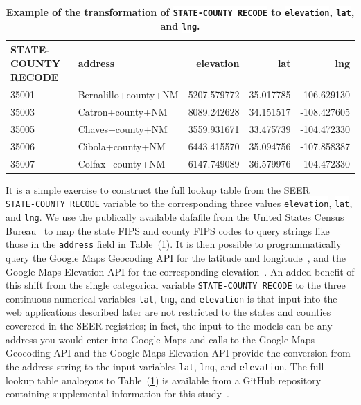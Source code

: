 \documentclass[10pt,letterpaper]{article}
\newcommand{\codewhite}[1]{\colorbox{white}{\texttt{#1}}}
\begin{document}
\begin{table}[!ht]
\begin{adjustwidth}{-2.25in}{0in} %
\caption{\label{tab:nmhead} {\bf Example of the transformation of \codewhite{STATE-COUNTY RECODE} to \codewhite{elevation}, \codewhite{lat}, and \codewhite{lng}.}}
\begin{tabular}{llrrr}
\toprule
 STATE-COUNTY RECODE &               address &    elevation &        lat &         lng \\
\midrule
35001 &  Bernalillo+county+NM &  5207.579772 &  35.017785 & -106.629130 \\
35003 &      Catron+county+NM &  8089.242628 &  34.151517 & -108.427605 \\
35005 &      Chaves+county+NM &  3559.931671 &  33.475739 & -104.472330 \\
35006 &      Cibola+county+NM &  6443.415570 &  35.094756 & -107.858387 \\
35007 &      Colfax+county+NM &  6147.749089 &  36.579976 & -104.472330 \\
\bottomrule
\end{tabular}
\end{adjustwidth}
\end{table}

It is a simple exercise to construct the full lookup table from the SEER \\  \codewhite{STATE-COUNTY RECODE} variable to the corresponding three values \codewhite{elevation}, \codewhite{lat}, and \codewhite{lng}. We use the publically available dafafile from the United States Census Bureau~\cite{census} to map the state FIPS and county FIPS codes to query strings like those in the \codewhite{address} field in Table~(\ref{tab:nmhead}). 
It is then possible to programmatically query the Google Maps Geocoding API for the latitude and longitude~\cite{geocode}, and the Google Maps Elevation API for the corresponding elevation~\cite{elevation}.
An added benefit of this shift from the single categorical variable \codewhite{STATE-COUNTY RECODE} to the three continuous numerical variables \codewhite{lat}, \codewhite{lng}, and \codewhite{elevation} is that input into the web applications described later are not restricted to the states and counties coverered in the SEER registries; in fact, the input to the models can be any address you would enter into Google Maps and calls to the Google Maps Geocoding API and the Google Maps Elevation API provide the conversion from the address string to the input variables \codewhite{lat}, \codewhite{lng}, and \codewhite{elevation}. The full lookup table analogous to Table~(\ref{tab:nmhead}) is available from a GitHub repository containing supplemental information for this study~\cite{supp}. 
\end{document}
